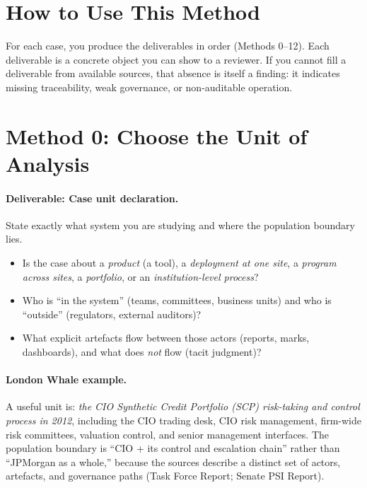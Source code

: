 \section{How to Use This Method}

For each case, you produce the deliverables in order (Methods 0--12). Each deliverable is a concrete object
you can show to a reviewer. If you cannot fill a deliverable from available sources, that absence is itself
a finding: it indicates missing traceability, weak governance, or non-auditable operation.

\section{Method 0: Choose the Unit of Analysis}
\label{sec:m0-unit}

\paragraph{Deliverable: Case unit declaration.}
State exactly what system you are studying and where the population boundary lies.

\begin{itemize}
  \item Is the case about a \emph{product} (a tool), a \emph{deployment at one site}, a \emph{program across sites},
        a \emph{portfolio}, or an \emph{institution-level process}?
  \item Who is “in the system” (teams, committees, business units) and who is “outside” (regulators, external auditors)?
  \item What explicit artefacts flow between those actors (reports, marks, dashboards), and what does \emph{not} flow (tacit judgment)?
\end{itemize}

\paragraph{London Whale example.}
A useful unit is: \emph{the CIO Synthetic Credit Portfolio (SCP) risk-taking and control process in 2012},
including the CIO trading desk, CIO risk management, firm-wide risk committees, valuation control, and senior management
interfaces. The population boundary is “CIO + its control and escalation chain” rather than “JPMorgan as a whole,”
because the sources describe a distinct set of actors, artefacts, and governance paths (Task Force Report; Senate PSI Report).


